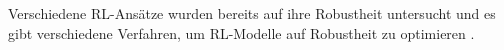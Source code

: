 Verschiedene RL-Ansätze wurden bereits auf ihre Robustheit untersucht und es gibt verschiedene Verfahren, um RL-Modelle auf Robustheit zu optimieren \cite{Moos.2022}.
